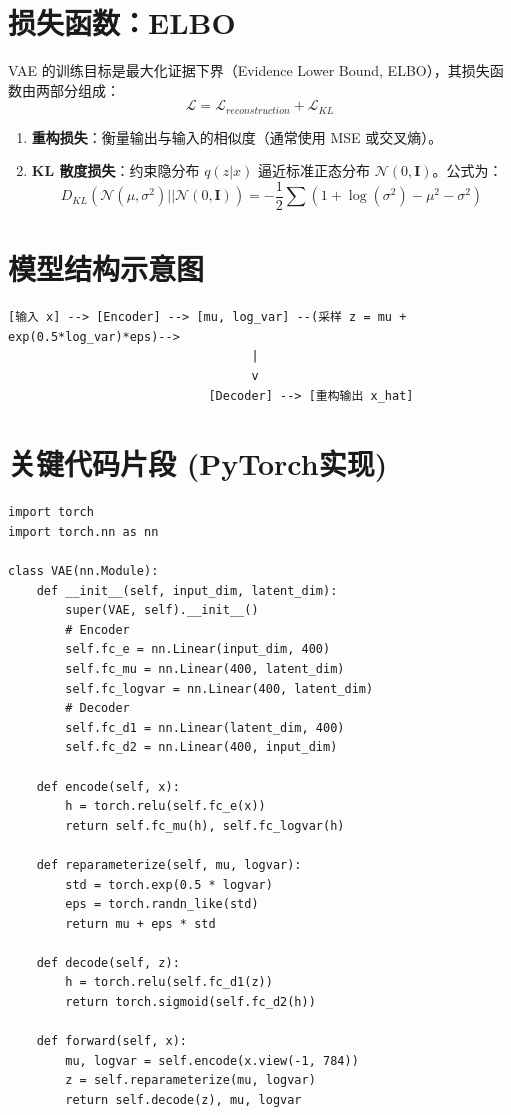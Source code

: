 \documentclass[12pt, a4paper]{article}
\begin{document}
\section{损失函数：ELBO}
VAE 的训练目标是最大化证据下界（Evidence Lower Bound, ELBO），其损失函数由两部分组成：
$$ \mathcal{L} = \mathcal{L}_{reconstruction} + \mathcal{L}_{KL} $$
\begin{enumerate}
    \item \textbf{重构损失}：衡量输出与输入的相似度（通常使用 MSE 或交叉熵）。
    \item \textbf{KL 散度损失}：约束隐分布 $q(z|x)$ 逼近标准正态分布 $\mathcal{N}(0, \mathbf{I})$。公式为：
    $$ D_{KL}( \mathcal{N}(\mu, \sigma^2) || \mathcal{N}(0, \mathbf{I}) ) = -\frac{1}{2} \sum (1 + \log(\sigma^2) - \mu^2 - \sigma^2) $$
\end{enumerate}

\section{模型结构示意图}
\begin{verbatim}
[输入 x] --> [Encoder] --> [mu, log_var] --(采样 z = mu + exp(0.5*log_var)*eps)-->
                                  |
                                  v
                            [Decoder] --> [重构输出 x_hat]
\end{verbatim}

\section{关键代码片段 (PyTorch实现)}
\begin{lstlisting}
import torch
import torch.nn as nn

class VAE(nn.Module):
    def __init__(self, input_dim, latent_dim):
        super(VAE, self).__init__()
        # Encoder
        self.fc_e = nn.Linear(input_dim, 400)
        self.fc_mu = nn.Linear(400, latent_dim)
        self.fc_logvar = nn.Linear(400, latent_dim)
        # Decoder
        self.fc_d1 = nn.Linear(latent_dim, 400)
        self.fc_d2 = nn.Linear(400, input_dim)

    def encode(self, x):
        h = torch.relu(self.fc_e(x))
        return self.fc_mu(h), self.fc_logvar(h)

    def reparameterize(self, mu, logvar):
        std = torch.exp(0.5 * logvar)
        eps = torch.randn_like(std)
        return mu + eps * std

    def decode(self, z):
        h = torch.relu(self.fc_d1(z))
        return torch.sigmoid(self.fc_d2(h))

    def forward(self, x):
        mu, logvar = self.encode(x.view(-1, 784))
        z = self.reparameterize(mu, logvar)
        return self.decode(z), mu, logvar
\end{lstlisting}
\end{document}

